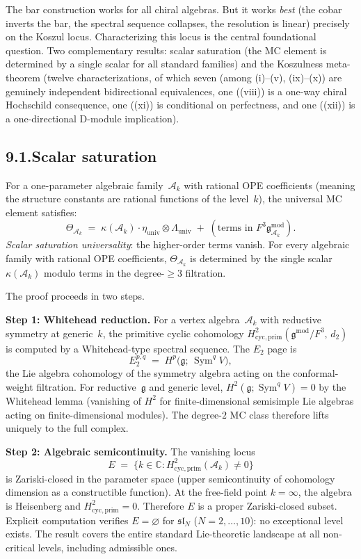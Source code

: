 \documentclass[11pt]{report}
\theoremstyle{definition}
\theoremstyle{remark}
\providecommand{\cA}{\mathcal{A}}
\numberwithin{equation}{section}
\begin{document}
The bar construction works for all chiral algebras. But it works
\emph{best} (the cobar inverts the bar, the spectral sequence
collapses, the resolution is linear) precisely on the Koszul locus.
Characterizing this locus is the central foundational question. Two
complementary results: scalar saturation (the MC element is determined by a single scalar for
all standard families) and the Koszulness meta-theorem (twelve
characterizations, of which seven (among (i)--(v), (ix)--(x)) are genuinely
independent bidirectional equivalences, one ((viii)) is a one-way
chiral Hochschild consequence, one ((xi)) is conditional on
perfectness, and one ((xii)) is a one-directional D-module implication).

\subsection*{9.1.\quad Scalar saturation}

For a one-parameter algebraic family~$\cA_k$ with rational OPE
coefficients (meaning the structure constants are rational functions
of the level~$k$), the universal MC element satisfies:
\[
\Theta_{\cA_k}
\;=\;
\kappa(\cA_k)\cdot\eta_{\mathrm{univ}}\otimes\Lambda_{\mathrm{univ}}
\;+\;
(\text{terms in $F^3\mathfrak g^{\mathrm{mod}}_{\cA_k}$}).
\]
\emph{Scalar saturation universality}: the higher-order terms vanish.
For every algebraic family with rational OPE coefficients,
$\Theta_{\cA_k}$ is determined by the single scalar
$\kappa(\cA_k)$ modulo terms in the degree-$\ge 3$ filtration.

The proof proceeds in two steps.

\medskip
\noindent\textbf{Step 1: Whitehead reduction.}
For a vertex algebra~$\cA_k$ with reductive symmetry at generic~$k$,
the primitive cyclic cohomology
$H^2_{\mathrm{cyc,prim}}(\mathfrak g^{\mathrm{mod}}/F^3,\,d_2)$ is
computed by a Whitehead-type spectral sequence. The $E_2$ page is
\[
E_2^{p,q}
\;=\;
H^p\!\bigl(\mathfrak g;\,
\operatorname{Sym}^q V\bigr),
\]
the Lie algebra cohomology of the symmetry algebra acting on the
conformal-weight filtration. For reductive~$\mathfrak g$ and generic
level, $H^2(\mathfrak g;\operatorname{Sym}^q V)=0$ by the Whitehead
lemma (vanishing of $H^2$ for finite-dimensional semisimple Lie
algebras acting on finite-dimensional modules). The degree-$2$ MC
class therefore lifts uniquely to the full complex.

\medskip
\noindent\textbf{Step 2: Algebraic semicontinuity.}
The vanishing locus
\[
E \;=\; \bigl\{k\in\mathbb C :
 H^2_{\mathrm{cyc,prim}}(\cA_k)\neq 0\bigr\}
\]
is Zariski-closed in the parameter space (upper semicontinuity of
cohomology dimension as a constructible function). At the free-field
point $k=\infty$, the algebra is Heisenberg and
$H^2_{\mathrm{cyc,prim}}=0$. Therefore $E$ is a proper
Zariski-closed subset. Explicit computation verifies $E=\varnothing$
for $\mathfrak{sl}_N$ ($N=2,\dots,10$): no exceptional level exists.
The result covers the entire standard Lie-theoretic landscape at all
non-critical levels, including admissible ones.
\end{document}
